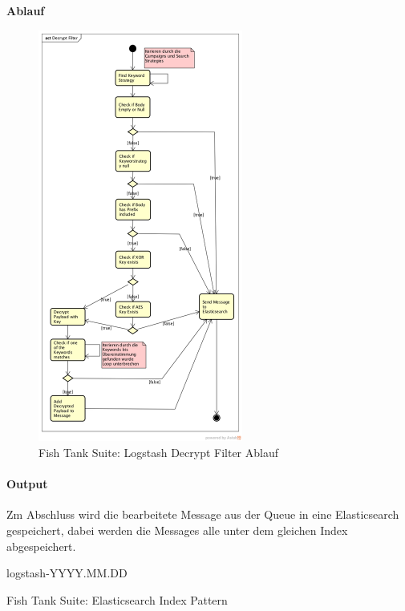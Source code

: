 \newpage
\textbf{Ablauf}
\begin{figure}[H]
	\centering
	\includegraphics[width=0.60\textwidth]{img/DecryptFilterActivitiyDiagram}
	\caption{Fish Tank Suite: Logstash Decrypt Filter Ablauf}
	\label{fig:logstash-decrypt-filter-ablauf}
\end{figure}

\paragraph{Output} Zm Abschluss wird die bearbeitete Message aus der Queue in eine Elasticsearch gespeichert, dabei werden die Messages alle unter dem gleichen Index abgespeichert.

\begin{listing}[H]
\begin{fancycode}
logstash-YYYY.MM.DD
\end{fancycode}
\caption{Fish Tank Suite: Elasticsearch Index Pattern}
\label{lst:elasticsearch-index-pattern}
\end{listing}


